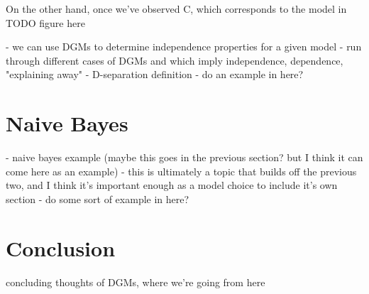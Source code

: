 On the other hand, once we've observed C, which corresponds to the model in TODO figure here

- we can use DGMs to determine independence properties for a given model
- run through different cases of DGMs and which imply independence, dependence, "explaining away"
- D-separation definition
- do an example in here?

\section{Naive Bayes}
- naive bayes example (maybe this goes in the previous section? but I think it can come here as an example)
- this is ultimately a topic that builds off the previous two, and I think it's important enough as a model choice to include it's own section
- do some sort of example in here?

\section{Conclusion}
concluding thoughts of DGMs, where we're going from here


